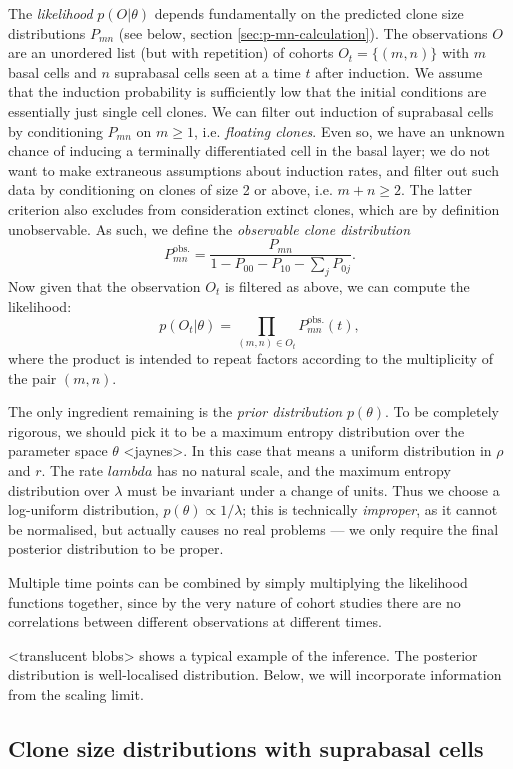 \documentclass[10pt,UKenglish]{article}
\begin{document}
The \emph{likelihood} $p(O|\theta)$ depends fundamentally on the predicted clone size distributions $P_{mn}$ (see below, section \ref{sec:p-mn-calculation}). The observations $O$ are an unordered list (but with repetition) of cohorts $O_t = \{(m,n)\}$ with $m$ basal cells and $n$ suprabasal cells seen at a time $t$ after induction. We assume that the induction probability is sufficiently low that the initial conditions are essentially just single cell clones. We can filter out induction of suprabasal cells by conditioning $P_{mn}$ on $m \ge 1$, i.e. \emph{floating clones}. Even so, we have an unknown chance of inducing a terminally differentiated cell in the basal layer; we do not want to make extraneous assumptions about induction rates, and filter out such data by conditioning on clones of size 2 or above, i.e. $m+n \ge 2$. The latter criterion also excludes from consideration extinct clones, which are by definition unobservable. As such, we define the \emph{observable clone distribution} $$P^\textrm{obs.}_{mn} = \frac{P_{mn}}{1 - P_{00} - P_{10} - \sum_j P_{0j}}.$$ Now given that the observation $O_t$ is filtered as above, we can compute the likelihood: $$p(O_t|\theta) = \prod_{(m,n) \in O_t} P^\textrm{obs.}_{mn}(t),$$ where the product is intended to repeat factors according to the multiplicity of the pair $(m,n)$.

The only ingredient remaining is the \emph{prior distribution} $p(\theta)$. To be completely rigorous, we should pick it to be a maximum entropy distribution over the parameter space $\theta$ <jaynes>. In this case that means a uniform distribution in $\rho$ and $r$. The rate $lambda$ has no natural scale, and the maximum entropy distribution over $\lambda$ must be invariant under a change of units. Thus we choose a log-uniform distribution, $p(\theta) \propto 1/\lambda$; this is technically \emph{improper}, as it cannot be normalised, but actually causes no real problems --- we only require the final posterior distribution to be proper.

Multiple time points can be combined by simply multiplying the likelihood functions together, since by the very nature of cohort studies there are no correlations between different observations at different times.

<translucent blobs> shows a typical example of the inference. The posterior distribution is well-localised distribution. Below, we will incorporate information from the scaling limit.

\subsection{\label{sec:p-mn-calculation}Clone size distributions with suprabasal cells}
\end{document}
